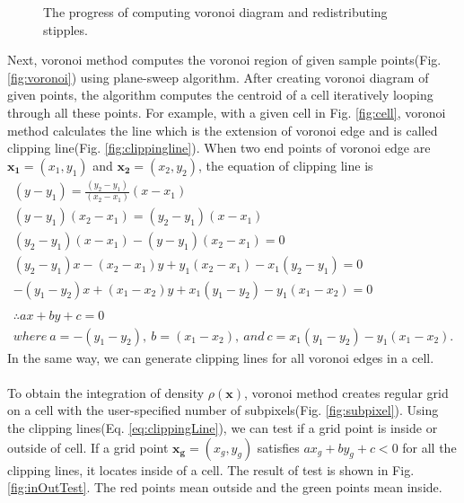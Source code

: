 \documentclass[11pt]{article}
\begin{document}
\begin{figure}[thb]
{    \label{fig:inOutTest}
  }\hspace{-3mm}
  \hspace{-3mm}
    \caption{The progress of computing voronoi diagram and redistributing stipples. \label{fig:createVoronoi}}
\end{figure}
Next, voronoi method computes the voronoi region of given sample points(Fig. \ref{fig:voronoi}) using plane-sweep algorithm. 
After creating voronoi diagram of given points, the algorithm computes the centroid of a cell iteratively looping through all these points.
For example, with a given cell in Fig. \ref{fig:cell}, voronoi method calculates the line which is the extension of voronoi edge and is called clipping line(Fig. \ref{fig:clippingline}).
When two end points of voronoi edge are $\mathbf{x_1}=(x_1,y_1)$ and $\mathbf{x_2}=(x_2,y_2)$, the equation of clipping line is
\begin{equation}\label{eq:clippingLine}
\begin{gathered}
(y-y_1) = \frac{(y_2-y_1)}{(x_2-x_1)}(x-x_1)\\
(y-y_1)(x_2-x_1) = (y_2-y_1)(x-x_1)\\
(y_2-y_1)(x-x_1)-(y-y_1)(x_2-x_1)= 0\\
(y_2-y_1)x-(x_2-x_1)y+y_1(x_2-x_1)-x_1(y_2-y_1)=0\\
-(y_1-y_2)x+(x_1-x_2)y+x_1(y_1-y_2)-y_1(x_1-x_2)=0\\\\
\therefore ax+by+c=0 \\where\:a=-(y_1-y_2),\:b=(x_1-x_2),\:and\:c=x_1(y_1-y_2)-y_1(x_1-x_2).
\end{gathered}
\end{equation}
In the same way, we can generate clipping lines for all voronoi edges in a cell.\\\\
To obtain the integration of density $\rho(\mathbf{x})$, voronoi method creates regular grid on a cell with the user-specified number of subpixels(Fig. \ref{fig:subpixel}).
Using the clipping lines(Eq. \ref{eq:clippingLine}), we can test if a grid point is inside or outside of cell. If a grid point $\mathbf{x_g}=(x_g, y_g)$ satisfies $ax_g+by_g+c<0$ for all the clipping lines, it locates inside of a cell. The result of test is shown in Fig. \ref{fig:inOutTest}. The red points mean outside and the green points mean inside.
\end{document}
